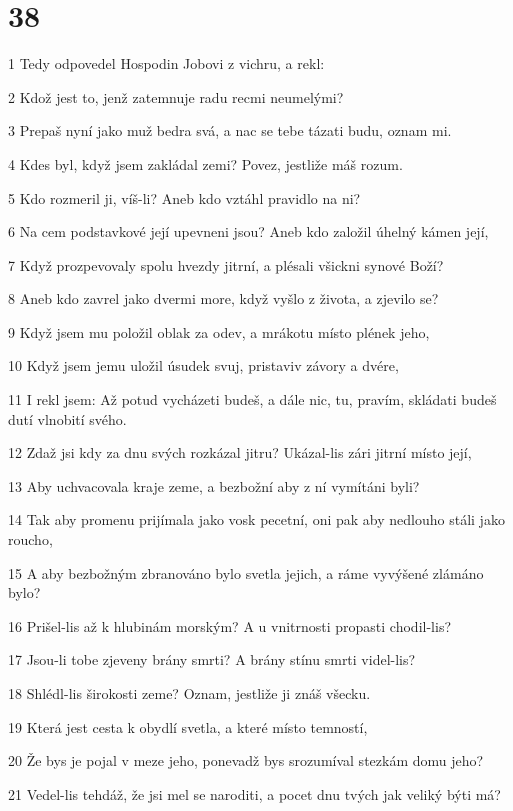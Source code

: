 \chapter{38}

\par 1 Tedy odpovedel Hospodin Jobovi z vichru, a rekl:
\par 2 Kdož jest to, jenž zatemnuje radu recmi neumelými?
\par 3 Prepaš nyní jako muž bedra svá, a nac se tebe tázati budu, oznam mi.
\par 4 Kdes byl, když jsem zakládal zemi? Povez, jestliže máš rozum.
\par 5 Kdo rozmeril ji, víš-li? Aneb kdo vztáhl pravidlo na ni?
\par 6 Na cem podstavkové její upevneni jsou? Aneb kdo založil úhelný kámen její,
\par 7 Když prozpevovaly spolu hvezdy jitrní, a plésali všickni synové Boží?
\par 8 Aneb kdo zavrel jako dvermi more, když vyšlo z života, a zjevilo se?
\par 9 Když jsem mu položil oblak za odev, a mrákotu místo plének jeho,
\par 10 Když jsem jemu uložil úsudek svuj, pristaviv závory a dvére,
\par 11 I rekl jsem: Až potud vycházeti budeš, a dále nic, tu, pravím, skládati budeš dutí vlnobití svého.
\par 12 Zdaž jsi kdy za dnu svých rozkázal jitru? Ukázal-lis zári jitrní místo její,
\par 13 Aby uchvacovala kraje zeme, a bezbožní aby z ní vymítáni byli?
\par 14 Tak aby promenu prijímala jako vosk pecetní, oni pak aby nedlouho stáli jako roucho,
\par 15 A aby bezbožným zbranováno bylo svetla jejich, a ráme vyvýšené zlámáno bylo?
\par 16 Prišel-lis až k hlubinám morským? A u vnitrnosti propasti chodil-lis?
\par 17 Jsou-li tobe zjeveny brány smrti? A brány stínu smrti videl-lis?
\par 18 Shlédl-lis širokosti zeme? Oznam, jestliže ji znáš všecku.
\par 19 Která jest cesta k obydlí svetla, a které místo temností,
\par 20 Že bys je pojal v meze jeho, ponevadž bys srozumíval stezkám domu jeho?
\par 21 Vedel-lis tehdáž, že jsi mel se naroditi, a pocet dnu tvých jak veliký býti má?
